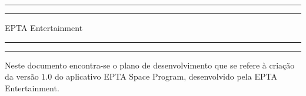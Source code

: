  


\begin{titlepage} %

	    \AddToShipoutPicture*{\BackgroundPic}
	    \begin{minipage}[h!]{0.36\textwidth}
            \phantom{..}
        \end{minipage} 
        \begin{minipage}[h!]{0.6\textwidth}
	
		\centering %
	
		\scshape %
	
	
		\rule{\textwidth}{1.6pt}\vspace*{-\baselineskip}\vspace*{2pt} %
		\rule{\textwidth}{0.4pt} %
	
		\vspace{0.75\baselineskip} %
	
		{\LARGE EPTA Entertainment\\} %
	
		\vspace{0.75\baselineskip} %
	
		\rule{\textwidth}{0.4pt}\vspace*{-\baselineskip}\vspace{3.2pt} %
		\rule{\textwidth}{1.6pt} %
	
		\vspace{2\baselineskip} %
	
	
		Neste documento encontra-se o plano de desenvolvimento que se refere à criação da versão $1.0$ do aplicativo EPTA Space Program, desenvolvido pela EPTA Entertainment.%
	

\end{minipage}
\end{titlepage}
